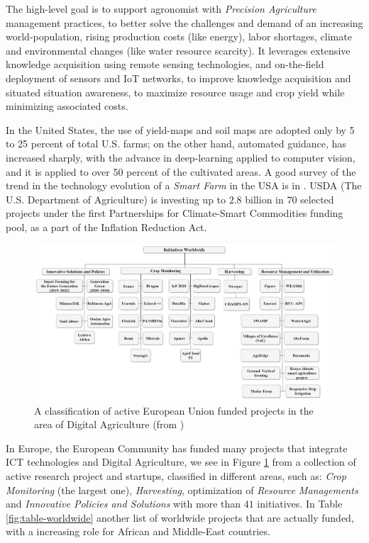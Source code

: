 \documentclass[comsoc,final]{IEEEtran}
\begin{document}
The high-level goal is to support agronomist with \emph{Precision Agriculture} management practices, to better solve the challenges and demand of an increasing world-population, rising production costs (like energy), labor shortages, climate and environmental changes (like water resource scarcity). It leverages extensive knowledge acquisition using remote sensing technologies, and on-the-field deployment of sensors and IoT networks, to improve knowledge acquisition and situated situation awareness, to maximize resource usage and crop yield while minimizing associated costs.

In the United States, the use of yield-maps and soil maps are adopted only by 5 to 25 percent of total U.S. farms; on the other hand, automated guidance, has increased sharply, with the advance in deep-learning applied to computer vision, and it is applied to over 50 percent of the cultivated areas. A good survey of the trend in the technology evolution of a \emph{Smart Farm} in the USA is in \cite{mcfadden2023precision}. USDA (The U.S. Department of Agriculture) is investing up to $2.8$ billion in $70$ selected projects under the first Partnerships for Climate-Smart Commodities funding pool, as a part of the Inflation Reduction Act.


\begin{figure}
    \centering
    \includegraphics[width=\columnwidth]{agriengineering-04-00029-g005}
    \caption{A classification of active European Union funded projects in the area of Digital Agriculture (from \cite{agriengineering4020029})}
    \label{fig:euprojects}
\end{figure}

In Europe, the European Community has funded many projects that integrate ICT technologies and Digital Agriculture, we see in Figure \ref{fig:euprojects} from \cite{agriengineering4020029} a collection of active research project and startups, classified in different areas, such as:  \emph{Crop Monitoring}  (the largest one), \emph{Harvesting}, optimization of \emph{Resource Managements} and \emph{Innovative Policies and Solutions} with more than $41$ initiatives. In Table \ref{fig:table-worldwide} another list of worldwide projects that are actually funded, with a increasing role for African and Middle-East countries.
\end{document}
